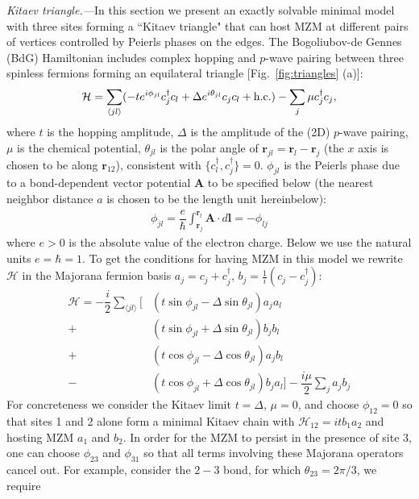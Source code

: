 \documentclass[aps,prb,twocolumn,showpacs,amsmath,amssymb,superscriptaddress]{revtex4-2}
\renewcommand{\vec}[1]{\mathbf{#1}}
\newcommand{\ham}{\mathcal{H}}
\newcommand{\cc}{c^{\dagger}}
\newcommand{\de}{\Delta}
\begin{document}
\emph{Kitaev triangle.---}In this section we present an exactly solvable minimal model with three sites forming a ``Kitaev triangle" that can host MZM at different pairs of vertices controlled by Peierls phases on the edges. The Bogoliubov-de Gennes (BdG) Hamiltonian includes complex hopping and $p$-wave pairing between three spinless fermions forming an equilateral triangle [Fig.~\ref{fig:triangles} (a)]:
\begin{equation}\label{eq:HBdG}
  \ham = \sum_{\langle j l \rangle} (-te^{i\phi_{jl}}\cc_{j} c_l + \de e^{i\theta_{jl}} c_{j} c_l + {\rm h.c.}) - \sum_{j} \mu \cc_j c_j,
\end{equation}
where $t$ is the hopping amplitude, $\de$ is the amplitude of the (2D) $p$-wave pairing, $\mu$ is the chemical potential, $\theta_{jl}$ is the polar angle of $\mathbf r_{jl} = \mathbf r_l - \mathbf r_j$ (the $x$ axis is chosen to be along $\mathbf r_{12}$), consistent with $\{c^\dag_l, c^\dag_j\} = 0$. $\phi_{jl}$ is the Peierls phase due to a bond-dependent vector potential $\mathbf A$ to be specified below (the nearest neighbor distance $a$ is chosen to be the length unit hereinbelow):
\begin{eqnarray}
\phi_{jl} = \dfrac{e}{\hbar} \int_{\mathbf r_j}^{\mathbf r_{l}} \vec{A} \cdot d\vec{l} = -\phi_{lj}
\end{eqnarray}
where $e>0$ is the absolute value of the electron charge. Below we use the natural units $e=\hbar=1$. To get the conditions for having MZM in this model we rewrite $\mathcal{H}$ in the Majorana fermion basis $a_{j} = c_j + c^\dag_j$, $b_j = \frac{1}{i}(c_j - c^\dag_j)$:
\begin{align}\label{eq:H3M}
    \ham =  -\dfrac{i}{2} \sum_{\langle j l \rangle} \Big[&\left(t\sin\phi_{jl}-\de\sin\theta_{jl}\right) a_j a_l \\\nonumber
  +&\left(t\sin\phi_{jl}+\de\sin\theta_{jl}\right) b_j b_l  \\\nonumber
  +&\left(t\cos\phi_{jl} - \de\cos\theta_{jl}\right) a_j b_l  \\\nonumber
  -&\left(t\cos\phi_{jl}+\de\cos\theta_{jl}\right) b_j a_l\Big]  -\dfrac{i\mu}{2} \sum_j  a_j b_j
\end{align}
For concreteness we consider the Kitaev limit $t=\de$, $\mu=0$, and choose $\phi_{12} = 0$ so that sites 1 and 2 alone form a minimal Kitaev chain with $\mathcal{H}_{12} = itb_1a_2$ and hosting MZM $a_1$ and $b_2$. In order for the MZM to persist in the presence of site 3, one can choose $\phi_{23}$ and $\phi_{31}$ so that all terms involving these Majorana operators cancel out. For example, consider the $2-3$ bond, for which $\theta_{23} = 2\pi/3$, we require
\end{document}
